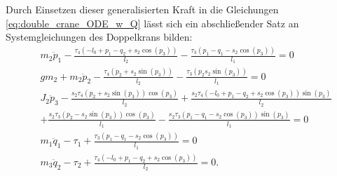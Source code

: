 Durch Einsetzen dieser generalisierten Kraft in die Gleichungen \eqref{eq:double_crane_ODE_w_Q} lässt sich ein abschließender Satz an Systemgleichungen des Doppelkrans bilden:
\begin{subequations}
	\begin{flalign}
	&m_{2} \ddot{p}_{1} - \frac{\tau_{4} \left(- l_{0} + p_{1} - q_{2} + s_{2} \cos{\left(p_{3} \right)}\right)}{l_{2}} - \frac{\tau_{3} \left(p_{1} - q_{1} - s_{2} \cos{\left(p_{3} \right)}\right)}{l_{1}} = 0 \label{double_flat_syseq1}\\
	&g m_{2} + m_{2} \ddot{p}_{2} - \frac{\tau_{4} \left(p_{2} + s_{2} \sin{\left(p_{3} \right)}\right)}{l_{2}} - \frac{\tau_{3} \left(p_{2} s_{2} \sin{\left(p_{3} \right)}\right)}{l_{1}} = 0 \label{double_flat_syseq2}\\
	&J_{2} \ddot{p}_{3} - \frac{s_{2} \tau_{4} \left(p_{2} + s_{2} \sin{\left(p_{3} \right)}\right) \cos{\left(p_{3} \right)}}{l_{2}} + \frac{s_{2} \tau_{4} \left(- l_{0} + p_{1} - q_{2} + s_{2} \cos{\left(p_{3} \right)}\right) \sin{\left(p_{3} \right)}}{l_{2}} \nonumber\\
	&+ \frac{s_{2} \tau_{3} \left(p_{2} - s_{2} \sin{\left(p_{3} \right)}\right) \cos{\left(p_{3} \right)}}{l_{1}} - \frac{s_{2} \tau_{3} \left(p_{1} - q_{1} - s_{2} \cos{\left(p_{3} \right)}\right) \sin{\left(p_{3} \right)}}{l_{1}} = 0 \label{double_flat_syseq3}\\
	&m_{1} \ddot{q}_{1} - \tau_{1} + \frac{\tau_{3} \left(p_{1} - q_{1} - s_{2} \cos{\left(p_{3} \right)}\right)}{l_{1}} = 0 \label{double_flat_syseq4}\\
	&m_{3} \ddot{q}_{2} - \tau_{2} + \frac{\tau_{4} \left(- l_{0} + p_{1} - q_{2} + s_{2} \cos{\left(p_{3} \right)}\right)}{l_{2}} = 0\label{double_flat_syseq5}.
	\end{flalign}
\end{subequations}

